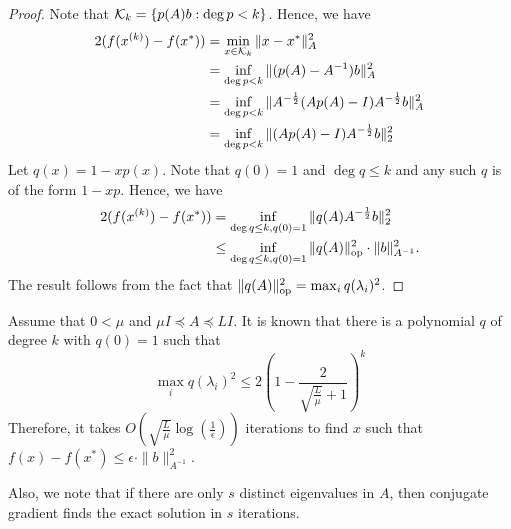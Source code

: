 \begin{proof}
Note that $\mathcal{K}_{k}=\{p(A)b:\deg p<k\}$. Hence, we have
\begin{align*}
2(f(x^{(k)})-f(x^{*})) & =\min_{x\in\mathcal{K}_{k}}\|x-x^{*}\|^{2}_{A}\\
 & =\inf_{\deg p<k}\|(p(A)-A^{-1})b\|^{2}_{A}\\
 & =\inf_{\deg p<k}\|A^{-\frac{1}{2}}(Ap(A)-I)A^{-\frac{1}{2}}b\|^{2}_{A}\\
 & =\inf_{\deg p<k}\|(Ap(A)-I)A^{-\frac{1}{2}}b\|^{2}_{2}
\end{align*}
Let $q(x)=1-xp(x)$. Note that $q(0)=1$ and $\deg q\leq k$ and any
such $q$ is of the form $1-xp$. Hence, we have
\begin{align*}
2(f(x^{(k)})-f(x^{*})) & =\inf_{\deg q\leq k,q(0)=1}\|q(A)A^{-\frac{1}{2}}b\|^{2}_{2}\\
 & \leq\inf_{\deg q\leq k,q(0)=1}\|q(A)\|^{2}_{\mathrm{op}}\cdot\|b\|^{2}_{A^{-1}}.
\end{align*}
The result follows from the fact that $\|q(A)\|^{2}_{\mathrm{op}}=\max_{i}q(\lambda_{i})^{2}$.
\end{proof}
Assume that $0<\mu$ and $\mu I\preceq A\preceq LI$. It is known
that there is a polynomial $q$ of degree $k$ with $q(0)=1$ such
that
\[
\max_{i}q(\lambda_{i})^{2}\leq2\left(1-\frac{2}{\sqrt{\frac{L}{\mu}}+1}\right)^{k}
\]
Therefore, it takes $O(\sqrt{\frac{L}{\mu}}\log(\frac{1}{\epsilon}))$
iterations to find $x$ such that $f(x)-f(x^{*})\leq\epsilon\cdot\|b\|^{2}_{A^{-1}}$.

Also, we note that if there are only $s$ distinct eigenvalues in
$A$, then conjugate gradient finds the exact solution in $s$ iterations.

%

